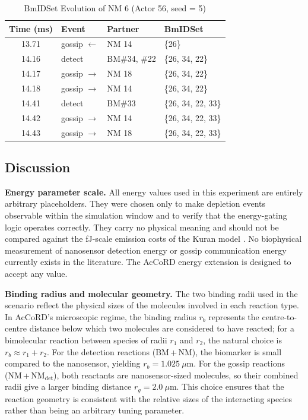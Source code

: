 \documentclass[journal]{IEEEtran}
\begin{document}
\begin{table}[!t]
\renewcommand{\arraystretch}{1.3}
\caption{BmIDSet Evolution of NM 6 (Actor 56, seed = 5)}
\label{tab:bmids}
\centering
\begin{tabular}{clll}
\hline
\textbf{Time (ms)} & \textbf{Event} & \textbf{Partner} & \textbf{BmIDSet} \\
\hline
13.71 & gossip $\leftarrow$ & NM 14 & \{26\} \\
14.16 & detect             & BM\#34, \#22 & \{26, 34, 22\} \\
14.17 & gossip $\to$       & NM 18 & \{26, 34, 22\} \\
14.18 & gossip $\to$       & NM 14 & \{26, 34, 22\} \\
14.41 & detect             & BM\#33 & \{26, 34, 22, 33\} \\
14.42 & gossip $\to$       & NM 14 & \{26, 34, 22, 33\} \\
14.43 & gossip $\to$       & NM 18 & \{26, 34, 22, 33\} \\
\hline
\end{tabular}
\end{table}

\subsection{Discussion}

\textbf{Energy parameter scale.}
All energy values used in this experiment are entirely arbitrary placeholders.
They were chosen only to make depletion events observable within the simulation
window and to verify that the energy-gating logic operates correctly. They
carry no physical meaning and should not be compared against the fJ-scale
emission costs of the Kuran model \cite{kuran2010energy}. No biophysical
measurement of nanosensor detection energy or gossip communication energy
currently exists in the literature. The AcCoRD energy extension is designed
to accept any value.

\textbf{Binding radius and molecular geometry.}
The two binding radii used in the scenario reflect the physical sizes of the
molecules involved in each reaction type. In AcCoRD's microscopic regime, the
binding radius $r_b$ represents the centre-to-centre distance below which two
molecules are considered to have reacted; for a bimolecular reaction between
species of radii $r_1$ and $r_2$, the natural choice is $r_b \approx r_1 + r_2$.
For the detection reactions (BM\,+\,NM), the biomarker is small compared to the
nanosensor, yielding $r_b = 1.025~\mu$m. For the gossip reactions
(NM\,+\,NM$_\mathrm{det}$), both reactants are nanosensor-sized molecules, so
their combined radii give a larger binding distance $r_g = 2.0~\mu$m. This
choice ensures that the reaction geometry is consistent with the relative sizes
of the interacting species rather than being an arbitrary tuning parameter.
\end{document}
